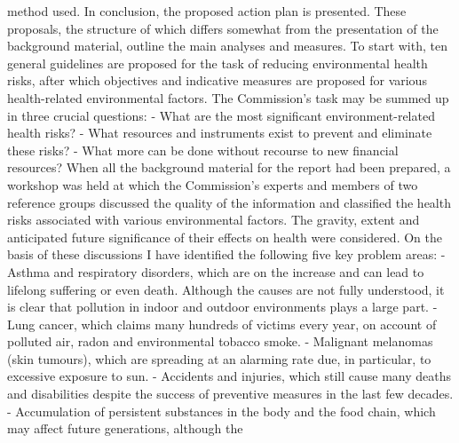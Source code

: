method used. In conclusion, the proposed action plan is presented.
These proposals, the structure of which differs somewhat from the presentation of the background material, outline the main analyses and measures. To start with, ten general guidelines are proposed for the task of reducing environmental health risks, after which objectives and indicative measures are proposed for various health-related environmental factors. The Commission's task may be summed up in three crucial questions:
- What are the most significant environment-related health risks?
- What resources and instruments exist to prevent and eliminate these risks?
- What more can be done without recourse to new financial resources?
When all the background material for the report had been prepared, a workshop was held at which the Commission's experts and members of two reference groups discussed the quality of the information and classified the health risks associated with various environmental factors. The gravity, extent and anticipated future significance of their effects on health were considered. On the basis of these discussions I have identified the following five key problem areas:
- Asthma and respiratory disorders, which are on the increase and can lead to lifelong suffering or even death. Although the causes are not fully understood, it is clear that pollution in indoor and outdoor environments plays a large part.
- Lung cancer, which claims many hundreds of victims every year, on account of polluted air, radon and environmental tobacco smoke.
- Malignant melanomas (skin tumours), which are spreading at an alarming rate due, in particular, to excessive exposure to sun.
- Accidents and injuries, which still cause many deaths and disabilities despite the success of preventive measures in the last few decades.
- Accumulation of persistent substances in the body and the food chain, which may affect future generations, although the

